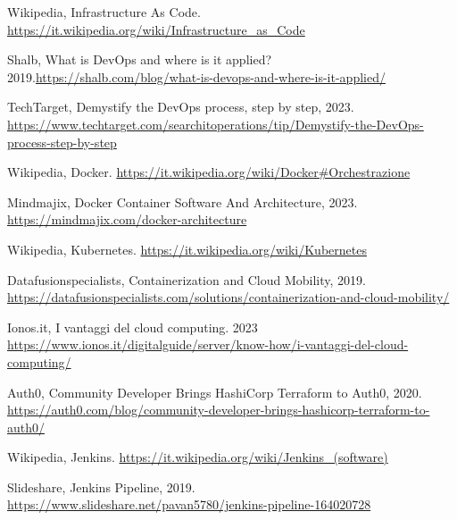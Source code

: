 \documentclass[a4paper,12pt]{report}
\begin{document}
%
%
\begin{thebibliography}{00}
%
Wikipedia, Infrastructure As Code. \url{https://it.wikipedia.org/wiki/Infrastructure_as_Code}

Shalb, What is DevOps and where is it applied? 2019.\url{https://shalb.com/blog/what-is-devops-and-where-is-it-applied/}

TechTarget, Demystify the DevOps process, step by step, 2023. \url{https://www.techtarget.com/searchitoperations/tip/Demystify-the-DevOps-process-step-by-step}

Wikipedia, Docker. \url{https://it.wikipedia.org/wiki/Docker#Orchestrazione}

Mindmajix, Docker Container Software And Architecture, 2023. \url{https://mindmajix.com/docker-architecture}

Wikipedia, Kubernetes. \url{https://it.wikipedia.org/wiki/Kubernetes}

Datafusionspecialists, Containerization and Cloud Mobility, 2019. \url{https://datafusionspecialists.com/solutions/containerization-and-cloud-mobility/}

Ionos.it, I vantaggi del cloud computing. 2023 \url{https://www.ionos.it/digitalguide/server/know-how/i-vantaggi-del-cloud-computing/}

Auth0, Community Developer Brings HashiCorp Terraform to Auth0, 2020. \url{https://auth0.com/blog/community-developer-brings-hashicorp-terraform-to-auth0/}

Wikipedia, Jenkins. \url{https://it.wikipedia.org/wiki/Jenkins_(software)}

Slideshare, Jenkins Pipeline, 2019. \url{https://www.slideshare.net/pavan5780/jenkins-pipeline-164020728}

%
%
\end{thebibliography}
% 
\end{document}
